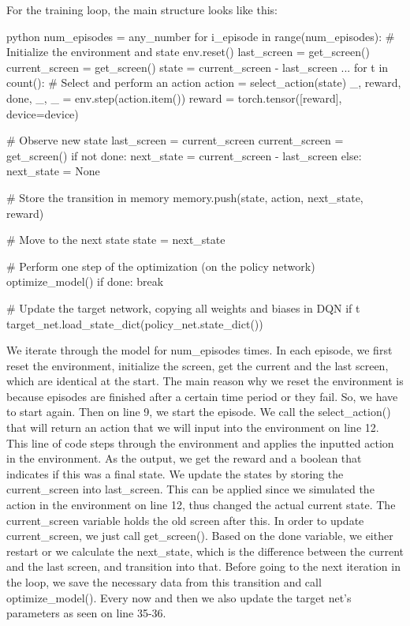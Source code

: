 \documentclass{article}
\numberwithin{equation}{section}
\numberwithin{equation}{section}
\begin{document}
For the training loop, the main structure looks like this:

\begin{mintedbox}{python}
num_episodes = any_number
for i_episode in range(num_episodes):
    # Initialize the environment and state
    env.reset()
    last_screen = get_screen()
    current_screen = get_screen()
    state = current_screen - last_screen
	...
	for t in count():
        # Select and perform an action
        action = select_action(state)
        _, reward, done, _, _ = env.step(action.item())
        reward = torch.tensor([reward], device=device)

        # Observe new state
        last_screen = current_screen
        current_screen = get_screen()
        if not done:
            next_state = current_screen - last_screen
        else:
            next_state = None

        # Store the transition in memory
        memory.push(state, action, next_state, reward)

        # Move to the next state
        state = next_state

        # Perform one step of the optimization (on the policy network)
        optimize_model()
        if done:
            break

        # Update the target network, copying all weights and biases in DQN
        if t %
            target_net.load_state_dict(policy_net.state_dict())
\end{mintedbox}

We iterate through the model for num\_episodes times. In each episode, we first reset the environment, initialize the screen, get the current and the last screen, which are identical at the start. The main reason why we reset the environment is because episodes are finished after a certain time period or they fail. So, we have to start again. Then on line 9, we start the episode. We call the select\_action() that will return an action that we will input into the environment on line 12. This line of code steps through the environment and applies the inputted action in the environment. As the output, we get the reward and a boolean that indicates if this was a final state. We update the states by storing the current\_screen into last\_screen. This can be applied since we simulated the action in the environment on line 12, thus changed the actual current state. The current\_screen variable holds the old screen after this. In order to update current\_screen, we just call get\_screen(). Based on the done variable, we either restart or we calculate the next\_state, which is the difference between the current and the last screen, and transition into that. Before going to the next iteration in the loop, we save the necessary data from this transition and call optimize\_model(). Every now and then we also update the target net's parameters as seen on line 35-36.
\end{document}
